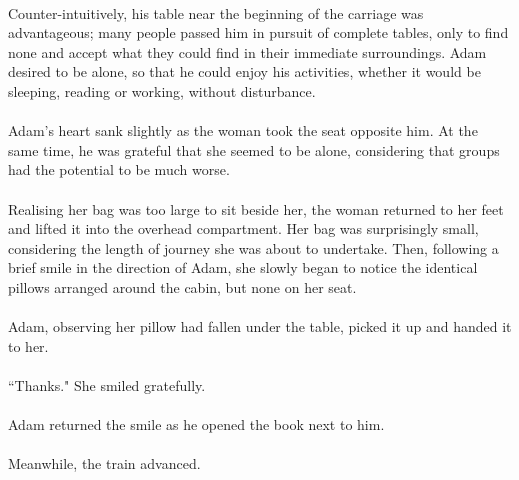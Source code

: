 \documentclass{article}
\begin{document}
\paragraph{}
Counter-intuitively, his table near the beginning of the carriage was advantageous; many people passed him in pursuit of complete tables, only to find none and accept what they could find in their immediate surroundings. Adam desired to be alone, so that he could enjoy his activities, whether it would be sleeping, reading or working, without disturbance.

\paragraph{}
Adam's heart sank slightly as the woman took the seat opposite him. At the same time, he was grateful that she seemed to be alone, considering that groups had the potential to be much worse.

\paragraph{}
Realising her bag was too large to sit beside her, the woman returned to her feet and lifted it into the overhead compartment. Her bag was surprisingly small, considering the length of journey she was about to undertake. Then, following a brief smile in the direction of Adam, she slowly began to notice the identical pillows arranged around the cabin, but none on her seat.

\paragraph{}
Adam, observing her pillow had fallen under the table, picked it up and handed it to her.

\paragraph{}
``Thanks." She smiled gratefully.

\paragraph{}
Adam returned the smile as he opened the book next to him.

\paragraph{}
Meanwhile, the train advanced.
\end{document}
